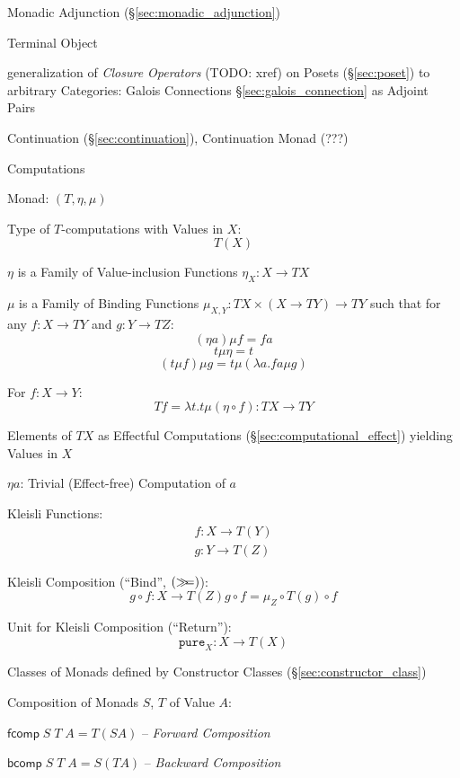 Monadic Adjunction (\S\ref{sec:monadic_adjunction})

Terminal Object %

generalization of \emph{Closure Operators} (TODO: xref) on Posets
(\S\ref{sec:poset}) to arbitrary Categories: Galois Connections
\S\ref{sec:galois_connection} as Adjoint Pairs

Continuation (\S\ref{sec:continuation}), Continuation Monad (???) %


\asterism


Computations

Monad: $(T,\eta,\mu)$

Type of $T$-computations with Values in $X$:
\[
  T (X)
\]

$\eta$ is a Family of Value-inclusion Functions $\eta_X : X
\rightarrow T X$

$\mu$ is a Family of Binding Functions $\mu_{X,Y} : T X \times (X
\rightarrow T Y) \rightarrow T Y$ such that for any $f : X \rightarrow
T Y$ and $g : Y \rightarrow T Z$:
\[
 (\eta a) \mu f = f a
\]\[
  t \mu \eta = t
\]\[
  (t \mu f) \mu g = t \mu (\lambda a.f a \mu g)
\]

For $f : X \rightarrow Y$:
\[
  T f = \lambda t.t \mu (\eta \circ f) : T X \rightarrow T Y
\]

Elements of $T X$ as Effectful Computations
(\S\ref{sec:computational_effect}) yielding Values in $X$

$\eta a$: Trivial (Effect-free) Computation of $a$


Kleisli Functions:
\[
\begin{split}
  f : X \rightarrow T(Y) \\
  g : Y \rightarrow T(Z)
\end{split}
\]

Kleisli Composition (``Bind'', $\mathtt{(\mathsf{\gg\kern-3pt=})}$):
\[
  g \circ f : X \rightarrow T(Z)
  g \circ f = \mu_Z \circ T(g) \circ f
\]

Unit for Kleisli Composition (``Return''):
\[
  \mathtt{pure}_X : X \rightarrow T (X)
\]


\asterism

\cite{jones95}

Classes of Monads defined by Constructor Classes
(\S\ref{sec:constructor_class})

Composition of Monads $S$, $T$ of Value $A$:

$\mathsf{fcomp}\;S\;T\;A = T (S A)$ -- \emph{Forward Composition}

$\mathsf{bcomp}\;S\;T\;A = S (T A)$ -- \emph{Backward Composition}

